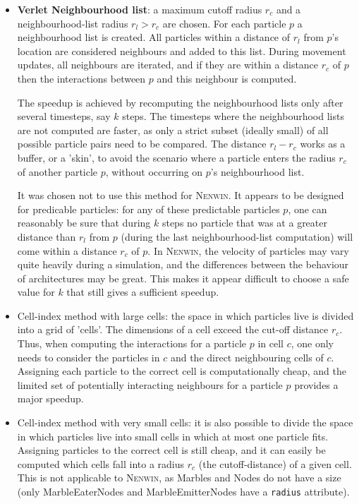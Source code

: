 \begin{itemize}
    \item \textbf{Verlet Neighbourhood list}: a maximum cutoff radius $r_c$ and a neighbourhood-list radius $r_l > r_c$ are chosen. For each particle $p$ a neighbourhood list is created. All particles within a distance of $r_l$ from $p$'s location are considered neighbours and added to this list. During movement updates, all neighbours are iterated, and if they are within a distance $r_c$ of $p$ then the interactions between $p$ and this neighbour is computed.
    
    The speedup is achieved by recomputing the neighbourhood lists only after several timesteps, say $k$ steps. The timesteps where the neighbourhood lists are not computed are faster, as only a strict subset (ideally small) of all possible particle pairs need to be compared.
    The distance $r_l - r_c$ works as a buffer, or a 'skin', to avoid the scenario where a particle enters the radius $r_c$ of another particle $p$, without occurring on $p$'s neighbourhood list. 
    
    It was chosen not to use this method for \textsc{Nenwin}. It appears to be designed for predicable particles: for any of these predictable particles $p$, one can reasonably be sure that during $k$ steps no particle that was at a greater distance than $r_l$  from $p$ (during the last neighbourhood-list computation) will come within a distance $r_c$ of $p$. In \textsc{Nenwin}, the velocity of particles may vary quite heavily during a simulation, and the differences between the behaviour of architectures may be great. This makes it appear difficult to choose a safe value for $k$ that still gives a sufficient speedup.
    
    \item{Cell-index method with large cells}: the space in which particles live is divided into a grid of 'cells'. The dimensions of a cell exceed the cut-off distance $r_c$. Thus, when computing the interactions for a particle $p$ in cell $c$, one only needs to consider the particles in $c$ and the direct neighbouring cells of $c$. Assigning each particle to the correct cell is computationally cheap, and the limited set of potentially interacting neighbours for a particle $p$ provides a major speedup.
    
    \item{Cell-index method with very small cells}: it is also possible to divide the space in which particles live into small cells in which at most one particle fits. Assigning particles to the correct cell is still cheap, and it can easily be computed which cells fall into a radius $r_c$ (the cutoff-distance) of a given cell. This is not applicable to \textsc{Nenwin}, as Marbles and Nodes do not have a size (only MarbleEaterNodes and MarbleEmitterNodes have a \texttt{radius} attribute).
    

\end{itemize}
